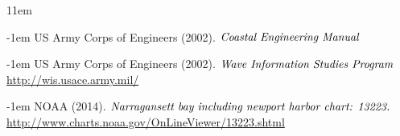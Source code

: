 \documentclass[10pt,letterpaper,titlepage]{report}
\begin{document}




\newpage
\nocite{*}
\def\bibindent{1em}
\begin{thebibliography}{1\kern\bibindent}
\makeatletter
\let\old@biblabel\@biblabel
\def\@biblabel#1{\old@biblabel{#1}\kern\bibindent}
\let\old@bibitem\bibitem
\def\bibitem#1{\old@bibitem{#1}\leavevmode\kern-\bibindent}
\makeatother

US Army Corps of Engineers (2002). 
$\emph{Coastal Engineering Manual}$

US Army Corps of Engineers (2002). 
$\emph{Wave Information Studies Program}$ \\
\url{http://wis.usace.army.mil/}

NOAA (2014). 
$\emph{Narragansett bay including newport harbor chart: 13223.}$ \\
\url{http://www.charts.noaa.gov/OnLineViewer/13223.shtml}

\end{thebibliography}

\end{document}
